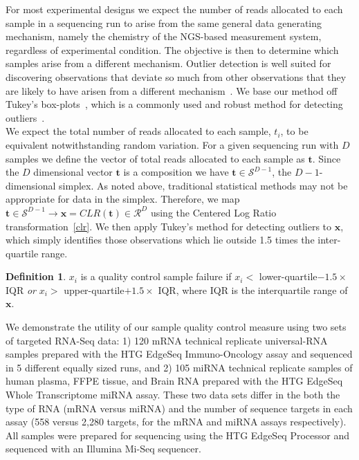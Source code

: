 \documentclass{article}\usepackage[]{graphicx}\usepackage[]{color}
\theoremstyle{definition}
\newtheorem{definition}{Definition}
\begin{document}
For most experimental designs we expect the number of reads allocated to each sample in a sequencing run to arise from the same general data generating mechanism, namely the chemistry of the NGS-based measurement system, regardless of experimental condition.  The objective is then to determine which samples arise from a different mechanism.  Outlier detection is well suited for discovering observations that deviate so much from other observations that they are likely to have arisen from a different mechanism~\cite{Hawkins1980}.  We base our method off Tukey's box-plots~\cite{Tukey1977}, which is a commonly used and robust method for detecting outliers~\cite{Ben-Gal2009}.\\

We expect the total number of reads allocated to each sample, $t_i$, to be equivalent notwithstanding random variation. For a given sequencing run with $D$ samples we define the vector of total reads allocated to each sample as $\mathbf{t}$.  Since the $D$ dimensional vector $\mathbf{t}$ is a composition we have $\mathbf{t} \in \mathcal{S}^{D-1}$, the $D-1$-dimensional simplex. As noted above, traditional statistical methods may not be appropriate for data in the simplex.  Therefore, we map $\mathbf{t} \in \mathcal{S}^{D-1} \rightarrow \mathbf{x} = CLR(\mathbf{t}) \in \mathcal{R}^D$ using the Centered Log Ratio transformation~\ref{clr}.  We then apply Tukey's method for detecting outliers to $\mathbf{x}$, which simply identifies those observations which lie outside 1.5 times the inter-quartile range.

\theoremstyle{definition}
\begin{definition}
$x_i$ is a quality control sample failure if $x_i <$ lower-quartile$- 1.5 \times$ IQR \emph{or}  $x_i >$ upper-quartile$+ 1.5 \times$ IQR, where IQR is the interquartile range of $\mathbf{x}$.
\end{definition}

We demonstrate the utility of our sample quality control measure using two sets of targeted RNA-Seq data: 1) 120 mRNA technical replicate universal-RNA samples prepared with the HTG EdgeSeq Immuno-Oncology assay and sequenced in 5 different equally sized runs, and 2) 105 miRNA technical replicate samples of human plasma, FFPE tissue, and Brain RNA prepared with the HTG EdgeSeq Whole Transcriptome miRNA assay.  These two data sets differ in the both the type of RNA (mRNA versus miRNA) and the number of sequence targets in each assay (558 versus 2,280 targets, for the mRNA and miRNA assays respectively).  All samples were prepared for sequencing using the HTG EdgeSeq Processor and sequenced with an Illumina Mi-Seq sequencer.\\
\end{document}
